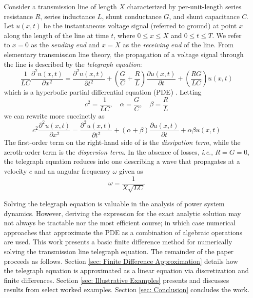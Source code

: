 \documentclass{article}
\begin{document}
Consider a transmission line of length $X$ characterized by per-unit-length
series resistance $R$,
series inductance $L$,
shunt conductance $G$,
and
shunt capacitance $C$.
Let $u \left(x,t\right)$ be the instantaneous voltage signal (referred to ground)
at point $x$ along the length of the line at time $t$,
where $0 \leq x \leq X$ and $0 \leq t \leq T$.
We refer to $x = 0$ as the \textit{sending end} and $x=X$ as the \textit{receiving end} of the line.
From elementary transmission line theory,
the propagation of a voltage signal through the line is described by the \textit{telegraph equation}:
\begin{equation}
   \label{eqn: Telegraph eqn full}
   \frac{1}{LC} \frac{\partial^{2} u \left(x,t\right)}{\partial x^{2}}
   =
   \frac{\partial^{2} u \left(x,t\right)}{\partial t^{2}}
   +
   \left(\frac{G}{C} + \frac{R}{L}\right) \frac{\partial u \left(x,t\right)}{\partial t}
   +
   \left(\frac{RG}{LC}\right) u \left(x,t\right)
\end{equation}
which is a hyperbolic partial differential equation (PDE) \citep{Chapra2015}.
Letting
\begin{equation*}
   c^{2} = \frac{1}{LC}, \quad \alpha = \frac{G}{C}, \quad \beta = \frac{R}{L}
\end{equation*}
we can rewrite  more succinctly as
\begin{equation}
   \label{eqn: Telegraph eqn short}
   c^{2} \frac{\partial^{2} u \left(x,t\right)}{\partial x^{2}}
   =
   \frac{\partial^{2} u \left(x,t\right)}{\partial t^{2}}
   +
   \left(\alpha + \beta\right) \frac{\partial u \left(x,t\right)}{\partial t}
   +
   \alpha \beta u \left(x,t\right)
\end{equation}
The first-order term on the right-hand side of  is the \textit{dissipation term},
while the zeroth-order term is the \textit{dispersion term}.
In the absence of losses, \textit{i.e.}, $R=G=0$, the telegraph equation reduces into one describing a wave
that propagates at a velocity $c$ and an angular frequency $\omega$ given as
\begin{equation}
   \label{eqn: Omega}
   \omega = \frac{1}{X \sqrt{LC}}
\end{equation}

Solving the telegraph equation is valuable in the analysis of power system dynamics.
However, deriving the expression for the exact analytic solution may not always be tractable nor the most efficient course;
in which case numerical approaches that approximate the PDE as a combination of algebraic operations are used.
This work presents a basic finite difference method for numerically solving the transmission line telegraph equation.
The remainder of the paper proceeds as follows.
Section \ref{sec: Finite Difference Approximation} details how the telegraph equation is approximated as a linear equation via discretization and finite differences.
Section \ref{sec: Illustrative Examples} presents and discusses results from select worked examples.
Section \ref{sec: Conclusion} concludes the work.
\end{document}
